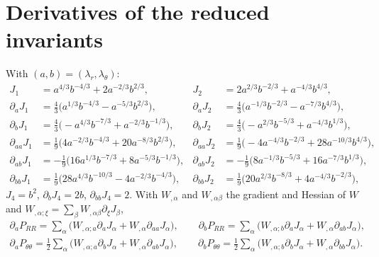 \documentclass[11pt,a4paper]{article}
\newcommand{\lt}{\lambda_\theta}
\newcommand{\lr}{\lambda_r}
\begin{document}
\appendix

\section{Derivatives of the reduced invariants}
\label{app:inv}
With $(a,b)=(\lr,\lt)$:
\begin{align*}
J_1&=a^{4/3}b^{-4/3}+2a^{-2/3}b^{2/3}, & J_2&=2a^{2/3}b^{-2/3}+a^{-4/3}b^{4/3},\\
\partial_aJ_1&=\tfrac43\big(a^{1/3}b^{-4/3}-a^{-5/3}b^{2/3}\big), & \partial_aJ_2&=\tfrac43\big(a^{-1/3}b^{-2/3}-a^{-7/3}b^{4/3}\big),\\
\partial_bJ_1&=\tfrac43\big(-a^{4/3}b^{-7/3}+a^{-2/3}b^{-1/3}\big), & \partial_bJ_2&=\tfrac43\big(-a^{2/3}b^{-5/3}+a^{-4/3}b^{1/3}\big),\\
\partial_{aa}J_1&=\tfrac19\big(4a^{-2/3}b^{-4/3}+20a^{-8/3}b^{2/3}\big), & \partial_{aa}J_2&=\tfrac19\big(-4a^{-4/3}b^{-2/3}+28a^{-10/3}b^{4/3}\big),\\
\partial_{ab}J_1&=-\tfrac19\big(16a^{1/3}b^{-7/3}+8a^{-5/3}b^{-1/3}\big), & \partial_{ab}J_2&=-\tfrac19\big(8a^{-1/3}b^{-5/3}+16a^{-7/3}b^{1/3}\big),\\
\partial_{bb}J_1&=\tfrac19\big(28a^{4/3}b^{-10/3}-4a^{-2/3}b^{-4/3}\big), & \partial_{bb}J_2&=\tfrac19\big(20a^{2/3}b^{-8/3}+4a^{-4/3}b^{-2/3}\big),
\end{align*}
$J_4=b^2$, $\partial_bJ_4=2b$, $\partial_{bb}J_4=2$. With $W_{,\alpha}$ and $W_{,\alpha\beta}$ the gradient and Hessian of $W$ and $W_{,\alpha;\xi}=\sum_\beta W_{,\alpha\beta}\partial_\xi J_\beta$,
\begin{gather*}
\partial_aP_{RR}=\sum_\alpha\big(W_{,\alpha;a}\partial_aJ_\alpha+W_{,\alpha}\partial_{aa}J_\alpha\big),\qquad
\partial_bP_{RR}=\sum_\alpha\big(W_{,\alpha;b}\partial_aJ_\alpha+W_{,\alpha}\partial_{ab}J_\alpha\big),\\
\partial_aP_{\theta\theta}=\tfrac12\sum_\alpha\big(W_{,\alpha;a}\partial_bJ_\alpha+W_{,\alpha}\partial_{ab}J_\alpha\big),\qquad
\partial_bP_{\theta\theta}=\tfrac12\sum_\alpha\big(W_{,\alpha;b}\partial_bJ_\alpha+W_{,\alpha}\partial_{bb}J_\alpha\big).
\end{gather*}
\end{document}
